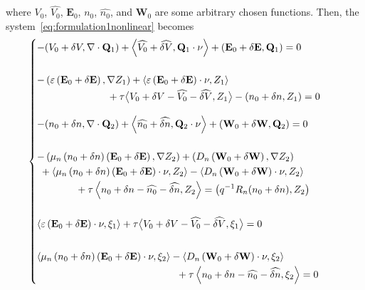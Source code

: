 \documentclass[a4paper,12pt, draft]{article}
\newcommand{\diver}[1]{\ensuremath{\nabla \cdot #1}}
\begin{document}
where  $V_0$, $\widehat{V_{0}}$, $\mathbf{E}_0$, $n_0$, $\widehat{n_{0}}$, and $\mathbf{W}_0$ are
some arbitrary chosen functions. Then, the system~\ref{eq:formulation1nonlinear} becomes
\begin{equation} \label{eq:horrible}
 \begin{cases}
  -(V_0 + \delta V, \diver{\mathbf{Q}_{1}}) + \left<\widehat{V_{0}} + \widehat{\delta V},
      \mathbf{Q}_{1} \cdot \nu \right> + \left(\mathbf{E}_{0} + \delta \mathbf{E}, \mathbf{Q}_{1}
      \right) = 0 \\[20pt]
  \begin{aligned}
  - \left(\varepsilon \left(\mathbf{E}_{0} + \delta \mathbf{E}\right), \nabla Z_{1}\right) +
       \left<\varepsilon \left(\mathbf{E}_{0} + \delta \mathbf{E}\right) \cdot \nu,
       Z_{1}\right> \\ & \hspace{-122pt} + \tau \big< V_{0} + \delta V - \widehat{V_{0}} -
      \widehat{\delta V}, Z_{1} \big> - (n_{0} + \delta n , Z_{1}) = 0
  \end{aligned} \\[20pt]
  -(n_{0} + \delta n, \diver{\mathbf{Q}_{2}}) + \left<\widehat{n_{0}} + \widehat{\delta n},
      \mathbf{Q}_{2} \cdot \nu \right> +
      \left(\mathbf{W}_{0} + \delta \mathbf{W}, \mathbf{Q}_{2} \right) = 0 \\[20pt]
  \begin{aligned}
  - \left(\mu_n \left(n_{0} + \delta n \right) \left(\mathbf{E}_{0} + \delta \mathbf{E}\right),
      \nabla Z_{2} \right) + \left( D_n \left(\mathbf{W}_{0} + \delta \mathbf{W}\right), \nabla
      Z_{2} \right) \\
      & \hspace{-255pt} + \left<\mu_n \left(n_{0} + \delta n \right) \left(\mathbf{E}_{0} + \delta
      \mathbf{E}\right) \cdot \nu, Z_{2} \right> - \left< D_n \left(\mathbf{W}_{0} + \delta
      \mathbf{W}\right) \cdot \nu, Z_{2} \right> \\
      & \hspace{-219pt} + \tau \left< n_{0} + \delta n - \widehat{n_{0}} - \widehat{\delta
      n}, Z_{2} \right>  = \left({q^{-1}}R_n(n_{0} + \delta n), Z_2\right)
  \end{aligned} \\[35pt]
  \left<\varepsilon \left(\mathbf{E}_{0} + \delta \mathbf{E}\right) \cdot \nu, \xi_{1}\right> +
      \tau \big< V_{0} + \delta V - \widehat{V_{0}} - \widehat{\delta V}, \xi_{1} \big> = 0 \\[20pt]
  \begin{aligned}
  \left<\mu_n \left(n_{0} + \delta n \right) \left(\mathbf{E}_{0} + \delta \mathbf{E}\right) \cdot
      \nu, \xi_{2} \right> - \left<D_n \left(\mathbf{W}_{0} + \delta \mathbf{W}\right) \cdot \nu,
      \xi_{2} \right> \\ & \hspace{-108pt} + \tau \left< n_{0} + \delta n - \widehat{n_{0}} -
      \widehat{\delta n}, \xi_{2} \right> = 0
  \end{aligned}
 \end{cases}
\end{equation}
\end{document}
